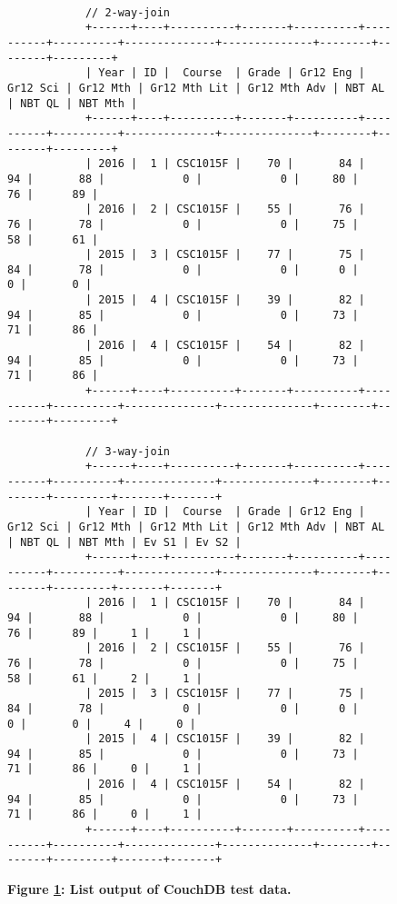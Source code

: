 \begin{figure}[H]
    \centering
    \begin{mdframed}[rightline=false,leftline=false]
        \centering
        \begin{BVerbatim}[fontsize=\tiny]

            // 2-way-join
            +------+----+----------+-------+----------+----------+----------+--------------+--------------+--------+--------+---------+
            | Year | ID |  Course  | Grade | Gr12 Eng | Gr12 Sci | Gr12 Mth | Gr12 Mth Lit | Gr12 Mth Adv | NBT AL | NBT QL | NBT Mth |
            +------+----+----------+-------+----------+----------+----------+--------------+--------------+--------+--------+---------+
            | 2016 |  1 | CSC1015F |    70 |       84 |       94 |       88 |            0 |            0 |     80 |     76 |      89 |
            | 2016 |  2 | CSC1015F |    55 |       76 |       76 |       78 |            0 |            0 |     75 |     58 |      61 |
            | 2015 |  3 | CSC1015F |    77 |       75 |       84 |       78 |            0 |            0 |      0 |      0 |       0 |
            | 2015 |  4 | CSC1015F |    39 |       82 |       94 |       85 |            0 |            0 |     73 |     71 |      86 |
            | 2016 |  4 | CSC1015F |    54 |       82 |       94 |       85 |            0 |            0 |     73 |     71 |      86 |
            +------+----+----------+-------+----------+----------+----------+--------------+--------------+--------+--------+---------+

            // 3-way-join
            +------+----+----------+-------+----------+----------+----------+--------------+--------------+--------+--------+---------+-------+-------+
            | Year | ID |  Course  | Grade | Gr12 Eng | Gr12 Sci | Gr12 Mth | Gr12 Mth Lit | Gr12 Mth Adv | NBT AL | NBT QL | NBT Mth | Ev S1 | Ev S2 |
            +------+----+----------+-------+----------+----------+----------+--------------+--------------+--------+--------+---------+-------+-------+
            | 2016 |  1 | CSC1015F |    70 |       84 |       94 |       88 |            0 |            0 |     80 |     76 |      89 |     1 |     1 |
            | 2016 |  2 | CSC1015F |    55 |       76 |       76 |       78 |            0 |            0 |     75 |     58 |      61 |     2 |     1 |
            | 2015 |  3 | CSC1015F |    77 |       75 |       84 |       78 |            0 |            0 |      0 |      0 |       0 |     4 |     0 |
            | 2015 |  4 | CSC1015F |    39 |       82 |       94 |       85 |            0 |            0 |     73 |     71 |      86 |     0 |     1 |
            | 2016 |  4 | CSC1015F |    54 |       82 |       94 |       85 |            0 |            0 |     73 |     71 |      86 |     0 |     1 |
            +------+----+----------+-------+----------+----------+----------+--------------+--------------+--------+--------+---------+-------+-------+

        \end{BVerbatim}
    \end{mdframed}
    \caption[CouchDB List output]{\textbf{Figure \ref{fig-test-list-output}: List output of CouchDB test data.}}
    \label{fig-test-list-output}
\end{figure}